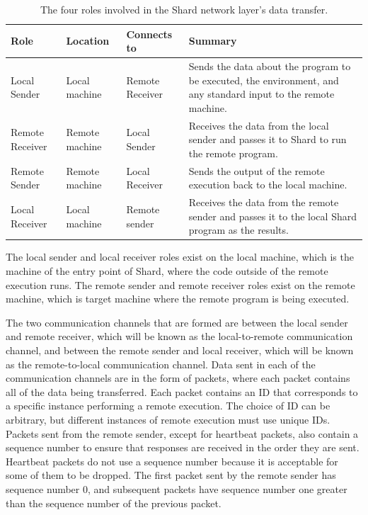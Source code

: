 \documentclass[oneside]{report}
\begin{document}
\begin{table}
  \begin{center}
    \begin{tabularx}{\textwidth}{|l|l|l|X|}
      \hline
      Role            & Location       & Connects to     & Summary                                                                                                         \\ \hline
      Local Sender    & Local machine  & Remote Receiver & Sends the data about the program to be executed, the environment, and any standard input to the remote machine.
      \\ \hline
      Remote Receiver & Remote machine & Local Sender    & Receives the data from the local sender and passes it to Shard to run the remote program.
      \\ \hline
      Remote Sender   & Remote machine & Local Receiver  & Sends the output of the remote execution back to the local machine.
      \\ \hline
      Local Receiver  & Local machine  & Remote sender   & Receives the data from the remote sender and passes it to the local Shard program as the results.
      \\ \hline
    \end{tabularx}
    \caption{The four roles involved in the Shard network layer's data transfer.}
    \label{fig:roles_design}
  \end{center}
\end{table}

The local sender and local receiver roles exist on the local machine, which is the machine of the entry point of Shard, where the code outside of the remote execution runs.
The remote sender and remote receiver roles exist on the remote machine, which is target machine where the remote program is being executed.

The two communication channels that are formed are between the local sender and remote receiver, which will be known as the local-to-remote communication channel, and between the remote sender and local receiver, which will be known as the remote-to-local communication channel.
Data sent in each of the communication channels are in the form of packets, where each packet contains all of the data being transferred.
Each packet contains an ID that corresponds to a specific instance performing a remote execution.
The choice of ID can be arbitrary, but different instances of remote execution must use unique IDs.
Packets sent from the remote sender, except for heartbeat packets, also contain a sequence number to ensure that responses are received in the order they are sent.
Heartbeat packets do not use a sequence number because it is acceptable for some of them to be dropped.
The first packet sent by the remote sender has sequence number 0, and subsequent packets have sequence number one greater than the sequence number of the previous packet.
\end{document}
